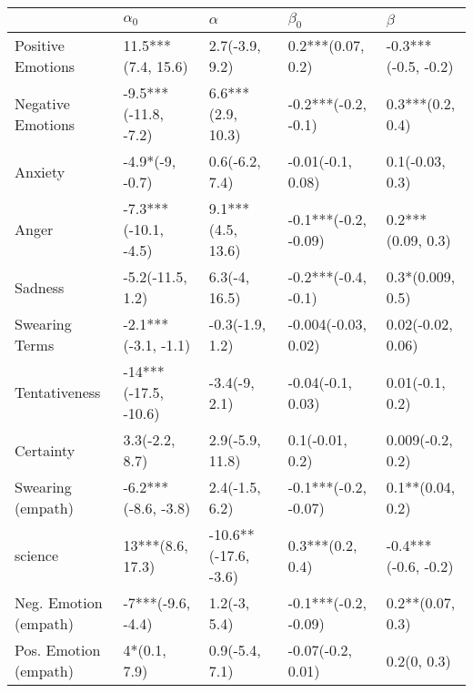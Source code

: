 \begin{tabular}{lllll}
\toprule
{} &            $\alpha_0$ &              $\alpha$ &             $\beta_0$ &              $\beta$ \\
\midrule
Positive Emotions     &    11.5***(7.4, 15.6) &        2.7(-3.9, 9.2) &     0.2***(0.07, 0.2) &  -0.3***(-0.5, -0.2) \\
Negative Emotions     &  -9.5***(-11.8, -7.2) &     6.6***(2.9, 10.3) &   -0.2***(-0.2, -0.1) &     0.3***(0.2, 0.4) \\
Anxiety               &       -4.9*(-9, -0.7) &        0.6(-6.2, 7.4) &     -0.01(-0.1, 0.08) &      0.1(-0.03, 0.3) \\
Anger                 &  -7.3***(-10.1, -4.5) &     9.1***(4.5, 13.6) &  -0.1***(-0.2, -0.09) &    0.2***(0.09, 0.3) \\
Sadness               &      -5.2(-11.5, 1.2) &         6.3(-4, 16.5) &   -0.2***(-0.4, -0.1) &     0.3*(0.009, 0.5) \\
Swearing Terms        &   -2.1***(-3.1, -1.1) &       -0.3(-1.9, 1.2) &   -0.004(-0.03, 0.02) &    0.02(-0.02, 0.06) \\
Tentativeness         &  -14***(-17.5, -10.6) &         -3.4(-9, 2.1) &     -0.04(-0.1, 0.03) &      0.01(-0.1, 0.2) \\
Certainty             &        3.3(-2.2, 8.7) &       2.9(-5.9, 11.8) &       0.1(-0.01, 0.2) &     0.009(-0.2, 0.2) \\
Swearing (empath)     &   -6.2***(-8.6, -3.8) &        2.4(-1.5, 6.2) &  -0.1***(-0.2, -0.07) &     0.1**(0.04, 0.2) \\
science               &      13***(8.6, 17.3) &  -10.6**(-17.6, -3.6) &      0.3***(0.2, 0.4) &  -0.4***(-0.6, -0.2) \\
Neg. Emotion (empath) &     -7***(-9.6, -4.4) &          1.2(-3, 5.4) &  -0.1***(-0.2, -0.09) &     0.2**(0.07, 0.3) \\
Pos. Emotion (empath) &          4*(0.1, 7.9) &        0.9(-5.4, 7.1) &     -0.07(-0.2, 0.01) &          0.2(0, 0.3) \\
\bottomrule
\end{tabular}
